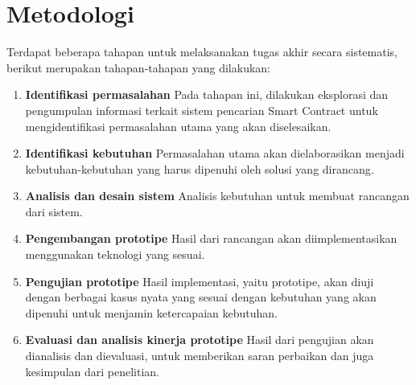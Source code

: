 \section{Metodologi}
\label{sec:metodologi}


Terdapat beberapa tahapan untuk melaksanakan tugas akhir secara sistematis, berikut merupakan tahapan-tahapan yang dilakukan:

\begin{enumerate}
  \item \textbf{Identifikasi permasalahan} \newline
        Pada tahapan ini, dilakukan eksplorasi dan pengumpulan informasi terkait sistem pencarian Smart Contract untuk mengidentifikasi permasalahan utama yang akan diselesaikan.
  \item \textbf{Identifikasi kebutuhan} \newline
        Permasalahan utama akan dielaborasikan menjadi kebutuhan-kebutuhan yang harus dipenuhi oleh solusi yang dirancang.
  \item \textbf{Analisis dan desain sistem} \newline
        Analisis kebutuhan untuk membuat rancangan dari sistem. 
  \item \textbf{Pengembangan prototipe} \newline
        Hasil dari rancangan akan diimplementasikan menggunakan teknologi yang sesuai.
  \item \textbf{Pengujian prototipe} \newline
        Hasil implementasi, yaitu prototipe, akan diuji dengan berbagai kasus nyata yang sesuai dengan kebutuhan yang akan dipenuhi untuk menjamin ketercapaian kebutuhan.
  \item \textbf{Evaluasi dan analisis kinerja prototipe} \newline
        Hasil dari pengujian akan dianalisis dan dievaluasi, untuk memberikan saran perbaikan dan juga kesimpulan dari penelitian.
\end{enumerate}



